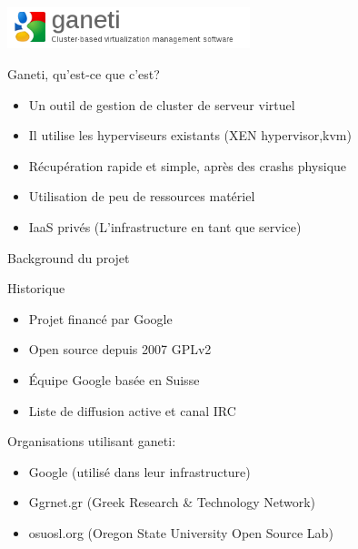 

%

\begin{frame}
  \begin{center}
   \includegraphics[width=200pt]{images/logo_ganeti.png}
  \end{center}
\end{frame}

\begin{frame}{Ganeti, qu'est-ce que c'est?}
\begin{itemize}
\item Un outil de gestion de cluster de serveur virtuel
\pause
\item Il utilise les hyperviseurs existants (XEN hypervisor,kvm)
\pause
\item Récupération rapide et simple, après des crashs physique
\pause
\item Utilisation de peu de ressources matériel
\pause
\item IaaS privés (L'infrastructure en tant que service)
\end{itemize}
\end{frame}



\begin{frame}{Background du projet}
\begin{block}{Historique}
  \begin{itemize}
  \item Projet financé par Google
\pause
  \item Open source depuis 2007 GPLv2
\pause
  \item Équipe Google basée en Suisse
\pause
  \item Liste de diffusion active et canal IRC
\pause
  \end{itemize}
\end{block}
\begin{block}{Organisations utilisant ganeti:}
  \begin{itemize}
  \item Google (utilisé dans leur infrastructure)
\pause
  \item Ggrnet.gr (Greek Research \& Technology Network)
\pause
  \item osuosl.org (Oregon State University Open Source Lab)
  \end{itemize}
\end{block}
\end{frame}

